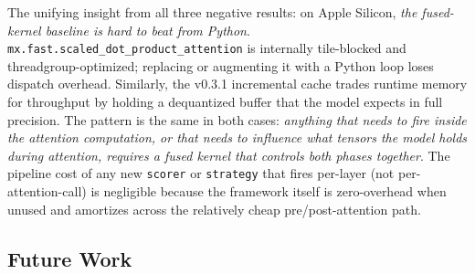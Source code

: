 \documentclass[11pt,a4paper]{article}
\begin{document}
The unifying insight from all three negative results: on Apple Silicon, \emph{the fused-kernel baseline is hard to beat from Python}. \texttt{mx.fast.scaled\_dot\_product\_attention} is internally tile-blocked and threadgroup-optimized; replacing or augmenting it with a Python loop loses dispatch overhead. Similarly, the v0.3.1 incremental cache trades runtime memory for throughput by holding a dequantized buffer that the model expects in full precision. The pattern is the same in both cases: \emph{anything that needs to fire inside the attention computation, or that needs to influence what tensors the model holds during attention, requires a fused kernel that controls both phases together}. The pipeline cost of any new \texttt{scorer} or \texttt{strategy} that fires per-layer (not per-attention-call) is negligible because the framework itself is zero-overhead when unused and amortizes across the relatively cheap pre/post-attention path.

\subsection*{Future Work}
\end{document}
